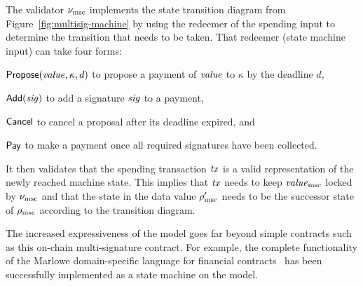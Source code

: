 The validator $\nu_{\mathrm{msc}}$ implements the state transition diagram from
Figure~\ref{fig:multisig-machine} by using the redeemer of the spending input to determine the transition that needs to be taken. That redeemer (state machine input) can take four forms: 
\begin{inparaenum}[(1)]
\item \(\mathsf{Propose}(\mathit{value}, \kappa, d)\) to propose a payment of $\mathit{value}$ to $\kappa$
  by the deadline $d$, 
\item \(\mathsf{Add}(\mathit{sig})\) to add a signature $\mathit{sig}$ to a payment, 
\item $\mathsf{Cancel}$ to cancel a proposal after its deadline expired, and 
\item $\mathsf{Pay}$ to make a payment once all required signatures have been collected. 
\end{inparaenum}
It then validates that the spending transaction $\mathit{tx}$ is a valid representation of the newly reached machine state. This implies that $\mathit{tx}$ needs to keep $\mathit{value}_{\mathrm{msc}}$ locked by $\nu_{\mathrm{msc}}$ and that the state in the data value $\rho'_{\mathrm{msc}}$ needs to be the successor state of $\rho_{\mathrm{msc}}$ according to the transition diagram.

The increased expressiveness of the \EUTXO{} model goes far beyond simple contracts such as this on-chain multi-signature contract. For example, the complete functionality of the Marlowe domain-specific language for financial contracts~\cite{marlowe} has been successfully implemented as a state machine on the \EUTXO{} model.
